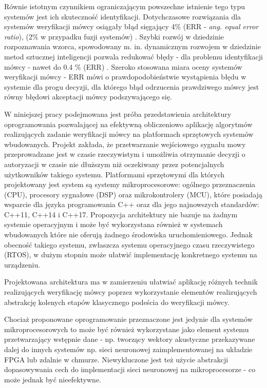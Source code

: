 Równie istotnym czynnikiem ograniczającym powszechne istnienie tego typu systemów jest ich skuteczność identyfikacji. Dotychczasowe rozwiązania dla systemów weryfikacji mówcy osiągały błąd sięgający 4\% (ERR - \textit{ang. equal error ratio}), (2\% w przypadku fuzji systemów) \cite{overview}. Szybki rozwój w dziedzinie rozpoznawania wzorca, spowodowany m. in. dynamicznym rozwojem w dziedzinie metod sztucznej inteligencji pozwala redukować błędy - dla problemu identyfikacji mówcy - nawet do 0.4
\% (ERR) \cite{deepfeaturelearning2017err}. Szeroko stosowana miara oceny systemów weryfikacji mówcy - ERR mówi o prawdopodobieństwie wystąpienia błędu w systemie dla progu decyzji, dla którego błąd odrzucenia prawdziwego mówcy jest równy błędowi akceptacji mówcy podszywającego się.  

W niniejszej pracy podejmowana jest próba przedstawienia architektury oprogramowania pozwalającej na efektywną obliczeniowo aplikację algorytmów realizujących zadanie weryfikacji mówcy na platformach sprzętowych systemów wbudowanych. Projekt zakłada, że przetwarzanie wejściowego sygnału mowy przeprowadzane jest w czasie rzeczywistym i umożliwia otrzymanie decyzji o autoryzacji w czasie nie dłuższym niż oczekiwany przez potencjalnych użytkowników takiego systemu.
Platformami sprzętowymi dla których projektowany jest system są systemy mikroprocesorowe: ogólnego przeznaczenia (CPU), procesory sygnałowe (DSP)  oraz mikrokontrolery (MCU), które posiadają wsparcie dla języka programowania C++ oraz dla jego najnowszych standardów: C++11, C++14 i C++17. Propozycja architektury nie bazuje na żadnym systemie operacyjnym i może być wykorzystana również w systemach wbudowanych które nie oferują żadnego środowiska uruchomieniowego. Jednak obecność takiego systemu, zwłaszcza systemu operacyjnego czasu rzeczywistego (RTOS), w dużym stopniu może ułatwić implementację konkretnego systemu na urządzeniu. 

Projektowana architektura ma w zamierzeniu ułatwiać aplikację różnych technik realizujących weryfikację mówcy poprzez wykorzystanie elementów realizujących abstrakcję kolenych etapów klasycznego podeścia do weryfikacji mówcy.

Chociaż proponowane oprogramowanie przeznaczone jest jedynie dla systemów mikroprocesorowych to może być również wykorzystane jako element systemu przetwarzający wstępnie dane - np. tworzący wektory akustyczne przekazywane dalej do innych systemów np. sieci neuronowej zaimplementowanej na układzie FPGA lub zdalnie w chmurze. Niewykluczone jest też użycie abstrakcji dopasowywania cech do implementacji sieci neuronowej na mikroprocesorze - co może jednak być nieefektywne. 


